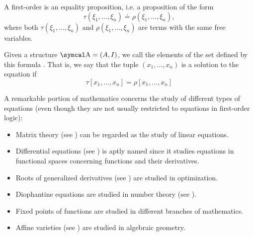 \begin{definition}\label{def:first_order_equation}
  A first-order  is an equality proposition, i.e. a proposition of the form
  \begin{equation*}
    \tau(\xi_1, \ldots, \xi_n) \doteq \rho(\xi_1, \ldots, \xi_n),
  \end{equation*}
  where both \( \tau(\xi_1, \ldots, \xi_n) \) and \( \rho(\xi_1, \ldots, \xi_n) \) are terms with the same free variables.

  Given a structure \( \CA = (A, I) \), we call the elements of the set defined by this formula . That is, we say that the tuple \( (x_1, \ldots, x_n) \) is a solution to the equation if
  \begin{equation*}
    \tau[x_1, \ldots, x_n] = \rho[x_1, \ldots, x_n]
  \end{equation*}
\end{definition}

\begin{remark}\label{remark:equations}
  A remarkable portion of mathematics concerns the study of different types of equations (even though they are not usually restricted to equations in first-order logic):

  \begin{itemize}
    \item Matrix theory (see ) can be regarded as the study of linear equations.
    \item Differential equations (see ) is aptly named since it studies equations in functional spaces concerning functions and their derivatives.
    \item Roots of generalized derivatives (see ) are studied in optimization.
    \item Diophantine equations are studied in number theory (see ).
    \item Fixed points of functions are studied in different branches of mathematics.
    \item Affine varieties (see ) are studied in algebraic geometry.
  \end{itemize}
\end{remark}

